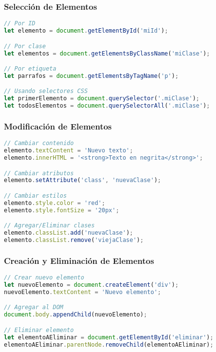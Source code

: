 \documentclass{book}
\begin{document}
\subsubsection{Selección de Elementos}

\begin{lstlisting}[language=JavaScript]
// Por ID
let elemento = document.getElementById('miId');

// Por clase
let elementos = document.getElementsByClassName('miClase');

// Por etiqueta
let parrafos = document.getElementsByTagName('p');

// Usando selectores CSS
let primerElemento = document.querySelector('.miClase');
let todosElementos = document.querySelectorAll('.miClase');
\end{lstlisting}

\subsubsection{Modificación de Elementos}

\begin{lstlisting}[language=JavaScript]
// Cambiar contenido
elemento.textContent = 'Nuevo texto';
elemento.innerHTML = '<strong>Texto en negrita</strong>';

// Cambiar atributos
elemento.setAttribute('class', 'nuevaClase');

// Cambiar estilos
elemento.style.color = 'red';
elemento.style.fontSize = '20px';

// Agregar/Eliminar clases
elemento.classList.add('nuevaClase');
elemento.classList.remove('viejaClase');
\end{lstlisting}

\subsubsection{Creación y Eliminación de Elementos}

\begin{lstlisting}[language=JavaScript]
// Crear nuevo elemento
let nuevoElemento = document.createElement('div');
nuevoElemento.textContent = 'Nuevo elemento';

// Agregar al DOM
document.body.appendChild(nuevoElemento);

// Eliminar elemento
let elementoAEliminar = document.getElementById('eliminar');
elementoAEliminar.parentNode.removeChild(elementoAEliminar);
\end{lstlisting}
\end{document}
